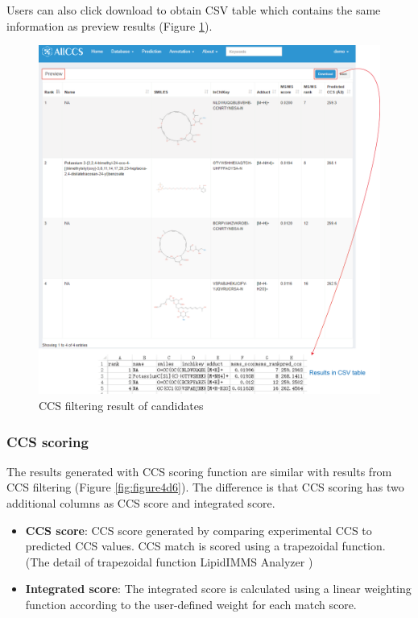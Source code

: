 \documentclass[12pt,]{book}
\providecommand{\tightlist}{%
  \setlength{\itemsep}{0pt}\setlength{\parskip}{0pt}}
\theoremstyle{definition}
\theoremstyle{definition}
\theoremstyle{definition}
\theoremstyle{remark}
\begin{document}
Users can also click download to obtain CSV table which contains the
same information as preview results (Figure \ref{fig:figure4d5}).

\begin{figure}

{\centering \includegraphics{images/chapter4/figure4.5candidate_rank_filter} 

}

\caption{CCS filtering result of candidates}\label{fig:figure4d5}
\end{figure}

\subsubsection{CCS scoring}\label{chapter4d2d3d2}

The results generated with CCS scoring function are similar with results
from CCS filtering (Figure \ref{fig:figure4d6}). The difference is that
CCS scoring has two additional columns as CCS score and integrated
score.

\begin{itemize}
\tightlist
\item
  \textbf{CCS score}: CCS score generated by comparing experimental CCS
  to predicted CCS values. CCS match is scored using a trapezoidal
  function. (The detail of trapezoidal function LipidIMMS Analyzer
  \citep{reference9})
\item
  \textbf{Integrated score}: The integrated score is calculated using a
  linear weighting function according to the user-defined weight for
  each match score.
\end{itemize}
\end{document}
